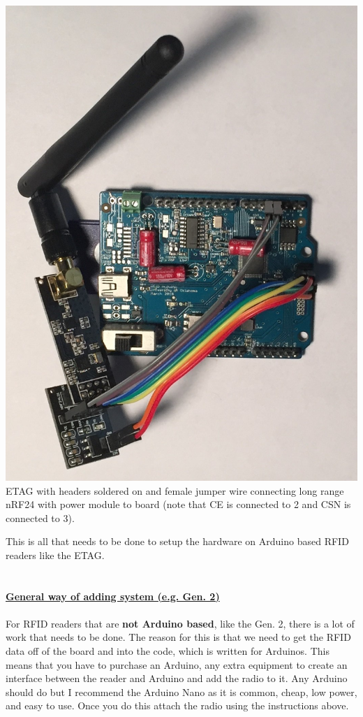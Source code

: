 \documentclass[12pt]{article}
\begin{document}
\begin{center}
	\includegraphics[width=6in,angle=180]{ETAG_Assembled}\\
	ETAG with headers soldered on and female jumper wire connecting long range nRF24 with power module to board (note that CE is connected to 2 and CSN is connected to 3).
\end{center}
This is all that needs to be done to setup the hardware on Arduino based RFID readers like the ETAG.\\\\\\
\underline{\textbf{General way of adding system (e.g. Gen. 2)}}\\\\
For RFID readers that are \textbf{not Arduino based}, like the Gen. 2, there is a lot of work that needs to be done.  The reason for this is that we need to get the RFID data off of the board and into the code, which is written for Arduinos.  This means that you have to purchase an Arduino, any extra equipment to create an interface between the reader and Arduino and add the radio to it.  Any Arduino should do but I recommend the Arduino Nano as it is common, cheap, low power, and easy to use.  Once you do this attach the radio using the instructions above.\\
\end{document}
